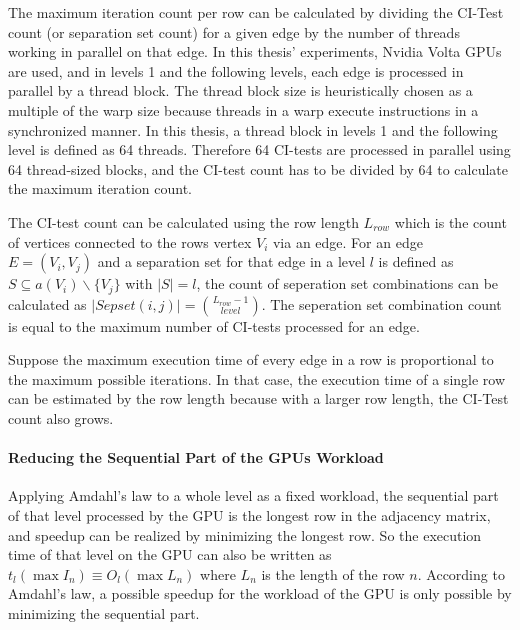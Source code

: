 The maximum iteration count per row can be calculated by dividing the CI-Test count (or separation set count) for a given edge by the number of threads working in parallel on that edge. In this thesis' experiments, Nvidia Volta GPUs \cite{NVIDIATESLAV1002017} are used, and in levels 1 and the following levels, each edge is processed in parallel by a thread block. The thread block size is heuristically chosen as a multiple of the warp size because threads in a warp execute instructions in a synchronized manner. In this thesis, a thread block in levels 1 and the following level is defined as 64 threads. Therefore 64 CI-tests are processed in parallel using 64 thread-sized blocks, and the CI-test count has to be divided by 64 to calculate the maximum iteration count.

The CI-test count can be calculated using the row length $L_{row}$ which is the count of vertices connected to the rows vertex $V_i$ via an edge. For an edge $E=(V_i,V_j)$ and a separation set for that edge in a level $l$ is defined as $S \subseteq a(V_i ) \backslash \{V_j\}$ with $| S | = l$, the count of seperation set combinations can be calculated as $|Sepset(i,j)| = {L_{row} - 1 \choose level}$. The seperation set combination count is equal to the maximum number of CI-tests processed for an edge.

Suppose the maximum execution time of every edge in a row is proportional to the maximum possible iterations. In that case, the execution time of a single row can be estimated by the row length because with a larger row length, the CI-Test count also grows.

\paragraph{Reducing the Sequential Part of the GPUs Workload}

Applying Amdahl's law \cite{amdahlValiditySingleProcessor1967} to a whole level as a fixed workload, the sequential part of that level processed by the GPU is the longest row in the adjacency matrix, and speedup can be realized by minimizing the longest row. So the execution time of that level on the GPU can also be written as $t_{l}(\max I_n) \equiv O_{l}(\max L_n)$ where $L_n$ is the length of the row $n$. According to Amdahl's law, a possible speedup for the workload of the GPU is only possible by minimizing the sequential part.

